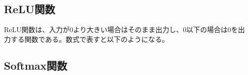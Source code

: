 \subsection*{ReLU関数}
ReLU関数は、入力が0より大きい場合はそのまま出力し、0以下の場合は0を出力する関数である。数式で表すと以下のようになる。

\subsection*{Softmax関数}




% 
% 
